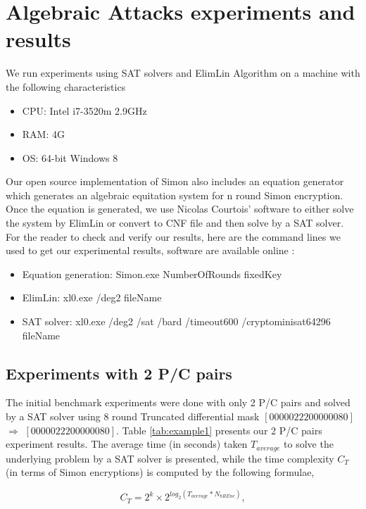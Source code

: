 \section{Algebraic Attacks experiments and results} \label{Sec:SimonResult}
We run experiments using SAT solvers and ElimLin Algorithm on a machine with the
following characteristics
\begin{small}
\begin{itemize}
	\item CPU: Intel i7-3520m 2.9GHz
	\item RAM: 4G
	\item OS: 64-bit Windows 8
\end{itemize}
\end{small}
Our open source implementation of Simon also includes an equation generator which generates an algebraic equitation system for n round Simon encryption. Once the equation is generated, we use Nicolas Courtois' software \cite{EquationSolving} to either solve the system by ElimLin or convert to CNF file and then solve by a SAT solver. For the reader to check and verify our results, here are the command lines we used to get our experimental results, software are available online \cite{simonref,EquationSolving} :
\begin{small}
\begin{itemize}
	\item Equation generation: Simon.exe NumberOfRounds fixedKey  
	\item ElimLin: xl0.exe /deg2 fileName 
	\item SAT solver: xl0.exe /deg2 /sat /bard /timeout600 /cryptominisat64296 fileName
\end{itemize}
\end{small}
\subsection{Experiments with 2 P/C pairs}
The initial benchmark experiments were done with only 2 P/C pairs and solved by a SAT solver using 8 round Truncated differential mask $[00000222 00000080]$ $\Rightarrow$ $[00000222 00000080]$. Table \ref{tab:example1} presents our 2 P/C pairs experiment results. The average time (in seconds) taken $T_{average}$
to solve the underlying problem
by a SAT solver is presented, while the time complexity $C_T$
(in terms of Simon encryptions) is
computed by the following formulae,

\begin{equation} \label{EQ:time_comp}
C_T=2^{k}\times2^{log_2(T_{average}*N_{8REnc})},
\end{equation}

